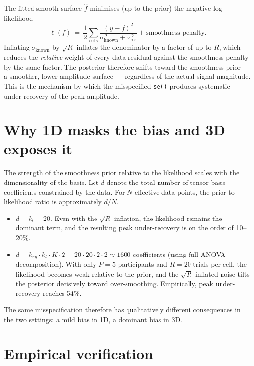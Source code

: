 \documentclass[11pt]{article}
\begin{document}
The fitted smooth surface $\hat f$ minimises (up to the prior)
the negative log-likelihood
\begin{equation}
\ell(f) \,=\, \frac{1}{2}\sum_{\text{cells}}
\frac{(\bar y - f)^2}{\sigma_{\text{known}}^{\,2} + \sigma_{\text{res}}^{\,2}}
+ \text{smoothness penalty}.
\end{equation}
Inflating $\sigma_{\text{known}}$ by $\sqrt{R}$ inflates the
denominator by a factor of up to $R$, which reduces the
\emph{relative} weight of every data residual against the
smoothness penalty by the same factor. The posterior therefore
shifts toward the smoothness prior --- a smoother, lower-amplitude
surface --- regardless of the actual signal magnitude. This is
the mechanism by which the misspecified \texttt{se()} produces
systematic under-recovery of the peak amplitude.

\section{Why 1D masks the bias and 3D exposes it}

The strength of the smoothness prior relative to the likelihood
scales with the dimensionality of the basis. Let $d$ denote the
total number of tensor basis coefficients constrained by the data.
For $N$ effective data points, the prior-to-likelihood ratio is
approximately $d/N$.

\begin{itemize}
\item[\textbf{1D (N\&B 2025):}]
$d = k_t = 20$. Even with the $\sqrt{R}$ inflation, the
likelihood remains the dominant term, and the resulting peak
under-recovery is on the order of 10--20\%.

\item[\textbf{3D (this thesis):}]
$d = k_{xy} \cdot k_t \cdot K \cdot 2 = 20 \cdot 20 \cdot 2 \cdot 2
\approx 1600$ coefficients (using full ANOVA decomposition).
With only $P=5$ participants and $R=20$ trials per cell, the
likelihood becomes weak relative to the prior, and the
$\sqrt{R}$-inflated noise tilts the posterior decisively toward
over-smoothing. Empirically, peak under-recovery reaches 54\%.
\end{itemize}

The same misspecification therefore has qualitatively different
consequences in the two settings: a mild bias in 1D, a dominant
bias in 3D.

\section{Empirical verification}
\end{document}
